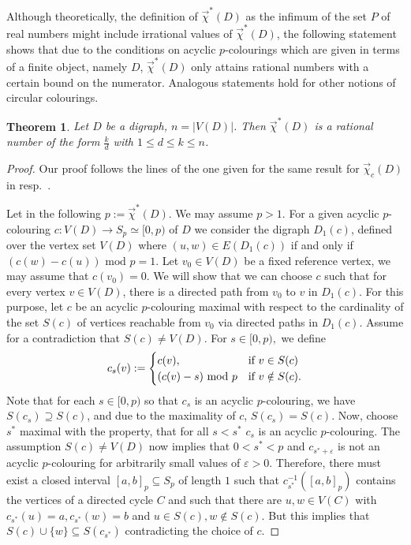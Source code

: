 \documentclass[fontsize=11pt,a4paper,DIV12]{scrartcl}
\theoremstyle{meiner}
\newtheorem{theorem}{Theorem}
\theoremstyle{definition}
\begin{document}
Although theoretically, the definition of $\vec{\chi}^\ast(D)$ as the
infimum of the set $P$ of real numbers might include irrational values
of $\vec{\chi}^\ast(D)$, the following statement shows that due to the
conditions on acyclic $p$-colourings which are given in terms of
a finite object, namely $D$, $\vec{\chi}^\ast(D)$ only attains
rational numbers with a certain bound on the numerator. Analogous
statements hold for other notions of circular colourings.
\begin{theorem} \label{rational}
Let $D$ be a digraph, $n=|V(D)|$. Then $\vec{\chi}^\ast(D)$ is a rational number of the form $\frac{k}{d}$ with $1 \leq d \leq k \leq n$.
\end{theorem}
\begin{proof}
  Our proof follows the lines of the one given for the 
  same result for $\vec{\chi}_c(D)$ in \cite{bokal} resp.\
  \cite{bojanbok}.  

  Let in the following $p:=\vec{\chi}^\ast(D)$. We may assume $p>1$. For a given acyclic
  $p$-colouring $c:V(D) \rightarrow S_p \simeq [0,p)$ of $D$ we
  consider the digraph $D_1(c)$, defined over the vertex set $V(D)$
  where $(u,w) \in E(D_1(c))$ if and only if $(c(w)-c(u)) \text{ mod
  }p=1$. Let $v_0 \in V(D)$ be a fixed reference vertex, we may assume
  that $c(v_0)=0$. We will show that we can choose $c$ such that for
  every vertex $v \in V(D)$, there is a directed path from $v_0$ to
  $v$ in $D_1(c)$. For this purpose, let $c$ be an acyclic
  $p$-colouring maximal with respect to the cardinality of the set
  $S(c)$ of vertices reachable from $v_0$ via directed paths in
  $D_1(c)$. Assume for a contradiction that $S(c) \neq V(D)$.  For $s \in
  [0,p),$ we define
  $$c_s(v):=\begin{cases} c(v), & \text{if }v \in S(c) \cr (c(v)-s)
    \text{ mod }p & \text{if }v \notin S(c).
  \end{cases}$$ Note that for each $s \in [0,p)$ so that $c_s$ is an acyclic $p$-colouring, we have $S(c_s) \supseteq S(c)$, and due to the maximality of $c$, $S(c_s)=S(c)$. Now, choose $s^\ast$ maximal with the property, that
  for all $s<s^\ast$ $c_s$ is an acyclic
  $p$-colouring. The assumption $S(c) \ne V(D)$
  now implies that $0 < s^\ast < p$ and $c_{s^\ast + \varepsilon}$ is
  not an acyclic $p$-colouring for arbitrarily small values of $\varepsilon
  >0$.  Therefore, there must exist a closed interval $[a,b]_p\subseteq
  S_p$ of length $1$ such that $c_{s^\ast}^{-1}([a,b]_p)$
  contains the vertices of a directed cycle $C$ and such that there are $u,w \in V(C)$ with $c_{s^\ast}(u)=a,c_{s^\ast}(w)=b$ and $u \in S(c), w \notin S(c)$. But this implies that $S(c)\cup \{w\} \subseteq
  S(c_{s^\ast})$ contradicting the choice of $c$.


\end{proof}
\end{document}
